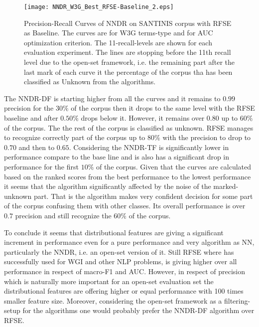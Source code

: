 \begin{figure}[H]
\begin{center}
    \texttt{[image: NNDR\_W3G\_Best\_RFSE-Baseline\_2.eps]}
	\caption{Precision-Recall Curves of NNDR on SANTINIS corpus with RFSE as Baseline. The curves are for W3G terms-type and for AUC optimization criterion. The 11-recall-levels are shown for each evaluation experiment. The lines are stopping before the 11th recall level due to the open-set framework, i.e. the remaining part after the last mark of each curve it the percentage of the corpus tha has been classified as Unknown from the algorithms.}
	\label{fig:NNDR_W3G_Best_RFSE_Baseline}
	\end{center}
\end{figure}

The NNDR-DF is starting higher from all the curves and it remains to $0.99$ precision for the $30\%$ of the corpus then it drops to the same level with the RFSE baseline and after $0.50\%$ drops below it. However, it remains over $0.80$ up to $60\%$ of the corpus. The the rest of the corpus is classified as unknown. RFSE manages to recognize correctly part of the corpus up to $80\%$ with the precision to drop to $0.70$ and then to $0.65$. Considering the NNDR-TF is significantly lower in performance compare to the base line and is also has a significant drop in performance for the first $10\%$ of the corpus. Given that the curves are calculated based on the ranked scores from the best performance to the lowest performance it seems that the algorithm significantly affected by the noise of the marked-unknown part. That is the algorithm makes very confident decision for some part of the corpus confusing them with other classes. Its overall performance is over $0.7$ precision and still recognize the $60\%$ of the corpus.

To conclude it seems that distributional features are giving a significant increment in performance even for a pure performance and very algorithm as NN, particularly the NNDR, i.e. an open-set version of it. Still RFSE where has successfully used for  WGI and other NLP problems, is giving higher over all performance in respect of macro-F1 and AUC. However, in respect of precision which is naturally more important for an open-set evaluation set the distributional features are offering higher or equal performance with 100 times smaller feature size. Moreover, considering the open-set framework as a filtering-setup for the algorithms one would probably prefer the NNDR-DF algorithm over RFSE.

